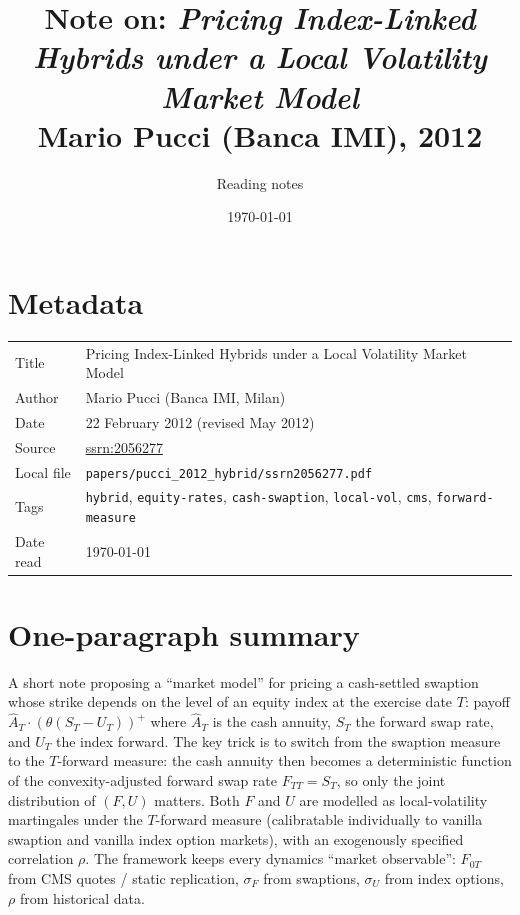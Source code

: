 \documentclass[11pt,a4paper]{article}
\title{Note on: \emph{Pricing Index-Linked Hybrids under a Local Volatility Market Model}\\
       \large Mario Pucci (Banca IMI), 2012}
\author{Reading notes}
\date{\today}
\begin{document}
\maketitle

\section*{Metadata}
\begin{tabular}{@{}p{3.5cm}p{11cm}@{}}
\toprule
Title           & Pricing Index-Linked Hybrids under a Local Volatility Market Model \\
Author          & Mario Pucci (Banca IMI, Milan) \\
Date            & 22 February 2012 (revised May 2012) \\
Source          & \href{https://ssrn.com/abstract=2056277}{ssrn:2056277} \\
Local file      & \texttt{papers/pucci\_2012\_hybrid/ssrn2056277.pdf} \\
Tags            & \texttt{hybrid}, \texttt{equity-rates}, \texttt{cash-swaption},
                  \texttt{local-vol}, \texttt{cms}, \texttt{forward-measure} \\
Date read       & \today \\
\bottomrule
\end{tabular}

\section*{One-paragraph summary}
A short note proposing a ``market model'' for pricing a cash-settled
swaption whose strike depends on the level of an equity index at the
exercise date $T$: payoff
$\widehat A_T \cdot (\theta(S_T - U_T))^+$ where $\widehat A_T$ is the
cash annuity, $S_T$ the forward swap rate, and $U_T$ the index
forward. The key trick is to switch from the swaption measure to the
$T$-forward measure: the cash annuity then becomes a deterministic
function of the convexity-adjusted forward swap rate $F_{T T} = S_T$,
so only the joint distribution of $(F, U)$ matters. Both $F$ and $U$
are modelled as local-volatility martingales under the $T$-forward
measure (calibratable individually to vanilla swaption and vanilla
index option markets), with an exogenously specified correlation
$\rho$. The framework keeps every dynamics ``market observable'':
$F_{0T}$ from CMS quotes / static replication, $\sigma_F$ from
swaptions, $\sigma_U$ from index options, $\rho$ from historical
data.
\end{document}
